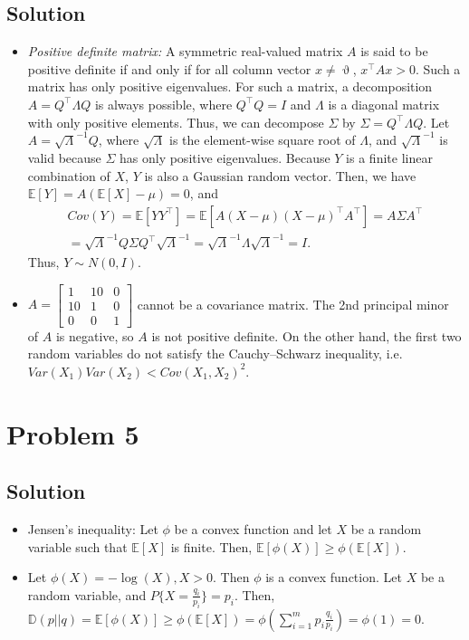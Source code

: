 \documentclass[11pt]{report}
\newcommand{\mb}{\mathbb}
\newcommand{\T}{\intercal}
\newcommand{\E}[1]{\mathbb{E}\left[#1\right]}
\begin{document}
\subsection*{Solution}
\begin{itemize}
  \item \textit{Positive definite matrix:} A symmetric real-valued matrix $A$ is said to be positive definite if and only if for all column vector $x \neq \upvartheta$, $x^\T A x > 0$. Such a matrix has only positive eigenvalues. For such a matrix, a decomposition $A = Q^\T \Lambda Q$ is always possible, where $Q^\T Q = I$ and $\Lambda$ is a diagonal matrix with only positive elements. Thus, we can decompose $\Sigma$ by $\Sigma = Q^\T \Lambda Q$. Let $A = \sqrt{\Lambda}^{-1} Q$, where $\sqrt{\Lambda}$ is the element-wise square root of $\Lambda$, and $\sqrt{\Lambda}^{-1}$ is valid because $\Sigma$ has only positive eigenvalues. Because $Y$ is a finite linear combination of $X$, $Y$ is also a Gaussian random vector. Then, we have $\E{Y} = A(\E{X} - \mu) = 0$, and
  \begin{multline*}
  Cov(Y) = \E{Y Y^\T} = \E{A (X-\mu)(X-\mu)^\T A^\T} = A \Sigma A^\T \\= \sqrt{\Lambda}^{-1} Q \Sigma Q^\T \sqrt{\Lambda}^{-1} = \sqrt{\Lambda}^{-1} \Lambda \sqrt{\Lambda}^{-1} = I.
  \end{multline*}
  Thus, $Y \sim N(0, I)$.
  \item $A = \begin{bmatrix} 1 &10 &0\\ 10 &1 &0\\ 0 &0 &1 \end{bmatrix}$ cannot be a covariance matrix. The 2nd principal minor of $A$ is negative, so $A$ is not positive definite. On the other hand, the first two random variables do not satisfy the Cauchy–Schwarz inequality, i.e. $Var(X_1)Var(X_2) < Cov(X_1, X_2)^2$.
\end{itemize}
\section*{Problem 5}
\subsection*{Solution}
\begin{itemize}
  \item Jensen's inequality: Let $\phi$ be a convex function and let $X$ be a random variable such that $\E{X}$ is finite. Then, $\E{\phi(X)} \geq \phi(\E{X})$.
  \item Let $\phi(X) = -\log(X), X > 0$. Then $\phi$ is a convex function. Let $X$ be a random variable, and $P\{X = \frac{q_i}{p_i}\} = p_i$. Then, $\mb{D}(p||q) = \E{\phi(X)} \geq \phi(\E{X}) = \phi(\sum_{i=1}^{m}p_i\frac{q_i}{p_i}) = \phi(1) = 0$.
\end{itemize}
\end{document}
